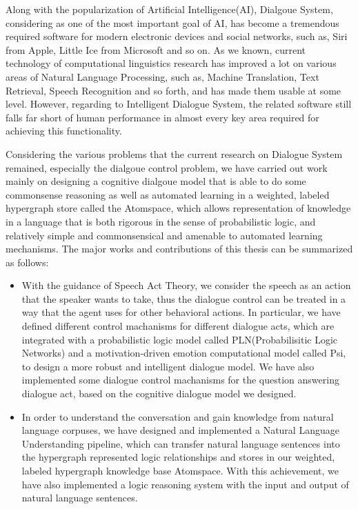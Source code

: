 \begin{englishabstract}
  
Along with the popularization of Artificial Intelligence(AI), Dialgoue System, considering as one of the most important goal of AI, has become a tremendous required software for modern electronic devices and social networks, such as, Siri from Apple, Little Ice from Microsoft and so on.  As we known, current technology of computational linguistics research has improved a lot on various areas of Natural Language Processing, such as, Machine Translation, Text Retrieval, Speech Recognition and so forth, and has made them usable at some level. However, regarding to Intelligent Dialogue System, the related software still falls far short of human performance in almost every key area required for achieving this functionality. 

Considering the various problems that the current research on Dialogue System remained, especially the dialgoue control problem, we have carried out work mainly on designing a cognitive dialgoue model that is able to do some commonsense reasoning as well as automated learning in a weighted, labeled hypergraph store called the Atomspace, which allows representation of knowledge in a language that is both rigorous in the sense of probabilistic logic, and relatively simple and commonsensical and amenable to automated learning mechanisms.  The major works and contributions of this thesis can be summarized as follows:


\begin{itemize}

\item With the guidance of Speech Act Theory, we consider the speech as an action that the speaker wants to take, thus the dialogue control can be treated in a way that the agent uses for other behavioral actions. In particular, we have defined different control machanisms for different dialogue acts, which are integrated with a probabilistic logic model called PLN(Probabilisitic Logic Networks) and a motivation-driven emotion computational model called Psi, to design a more robust and intelligent dialogue model. We have also implemented some dialogue control machanisms for the question answering dialogue act, based on the cognitive dialogue model we designed.

\item In order to understand the conversation and gain knowledge from natural language corpuses, we have designed and implemented a Natural Language Understanding pipeline, which can transfer natural language sentences into the hypergraph represented logic relationships and stores in our weighted, labeled hypergraph knowledge base Atomspace. With this achievement, we have also implemented a logic reasoning system with the input and output of natural language sentences.


\end{itemize}
\end{englishabstract}
